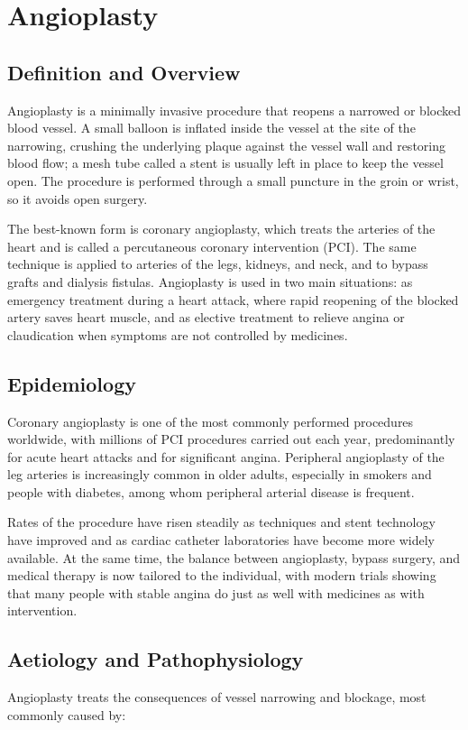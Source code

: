\chapter{Angioplasty}

\section*{Definition and Overview}
Angioplasty is a minimally invasive procedure that reopens a narrowed or blocked blood vessel. A small balloon is inflated inside the vessel at the site of the narrowing, crushing the underlying plaque against the vessel wall and restoring blood flow; a mesh tube called a stent is usually left in place to keep the vessel open. The procedure is performed through a small puncture in the groin or wrist, so it avoids open surgery.

The best-known form is coronary angioplasty, which treats the arteries of the heart and is called a percutaneous coronary intervention (PCI). The same technique is applied to arteries of the legs, kidneys, and neck, and to bypass grafts and dialysis fistulas. Angioplasty is used in two main situations: as emergency treatment during a heart attack, where rapid reopening of the blocked artery saves heart muscle, and as elective treatment to relieve angina or claudication when symptoms are not controlled by medicines.

\section*{Epidemiology}
Coronary angioplasty is one of the most commonly performed procedures worldwide, with millions of PCI procedures carried out each year, predominantly for acute heart attacks and for significant angina. Peripheral angioplasty of the leg arteries is increasingly common in older adults, especially in smokers and people with diabetes, among whom peripheral arterial disease is frequent.

Rates of the procedure have risen steadily as techniques and stent technology have improved and as cardiac catheter laboratories have become more widely available. At the same time, the balance between angioplasty, bypass surgery, and medical therapy is now tailored to the individual, with modern trials showing that many people with stable angina do just as well with medicines as with intervention.

\section*{Aetiology and Pathophysiology}
Angioplasty treats the consequences of vessel narrowing and blockage, most commonly caused by:

